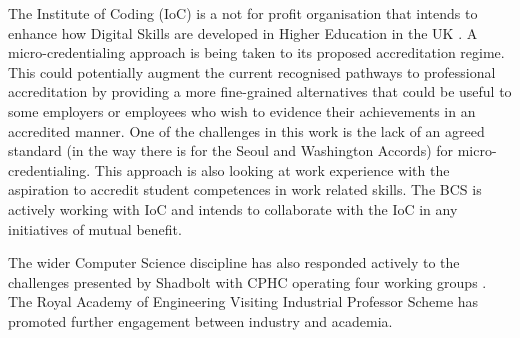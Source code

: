 \documentclass[sigconf]{acmart}
\begin{document}
\begin{comment}

In addition to IET and BCS, accreditation in the broad computing area in the UK is also being performed by a few different agencies. A number of bodies are providing endorsements intended to promote employability. Tech Partnership Degrees provides endorsements to Higher Education programmes with specific curricula elements aimed at job market requirements \cite{TP2019}. Tech Partnership Degrees have a specialist scope, endorsing programmes in the area of IT Management for Business and Software Engineering for Business. For games related degrees, TIGA a trade association representing the UK's games industry and  Screenskills (formerly Creative Skillset) \cite{Screenskills2019} operate a similar role. For digital forensics The Chartered Society of Forensic Sciences \cite{CSOFS2019} provides industry related endorsements.  National Cyber Security Centre (NCSC) is a UK Government organisation tasked with enhancing the cybersecurity of the UK and accredits programmes with significant cybersecurity content \cite{NCSC2018a}. There is little published regarding the effectiveness or otherwise of these endorsements.

\end{comment}

The Institute of Coding (IoC) is a not for profit organisation that intends to enhance how Digital Skills are developed in Higher Education in the UK \cite{Davenportetal2019a}. A micro-credentialing approach is being taken to its proposed accreditation regime. This could potentially augment the current recognised pathways to professional accreditation by providing a more fine-grained alternatives that could be useful to some employers or employees who wish to evidence their achievements in an accredited manner.  One of the challenges in this work is the lack of an agreed standard (in the way there is for the Seoul and Washington Accords) for micro-credentialing. This approach is also looking at work experience with the aspiration to accredit student competences in work related skills. The BCS is actively working with IoC and intends to collaborate with the IoC in any initiatives of mutual benefit.

The wider Computer Science discipline has also responded actively to the challenges presented by Shadbolt with CPHC operating four working groups \cite{cphc_2016}.  The Royal Academy of Engineering Visiting Industrial Professor Scheme \cite{royal} has promoted further engagement between industry and academia.
\end{document}
